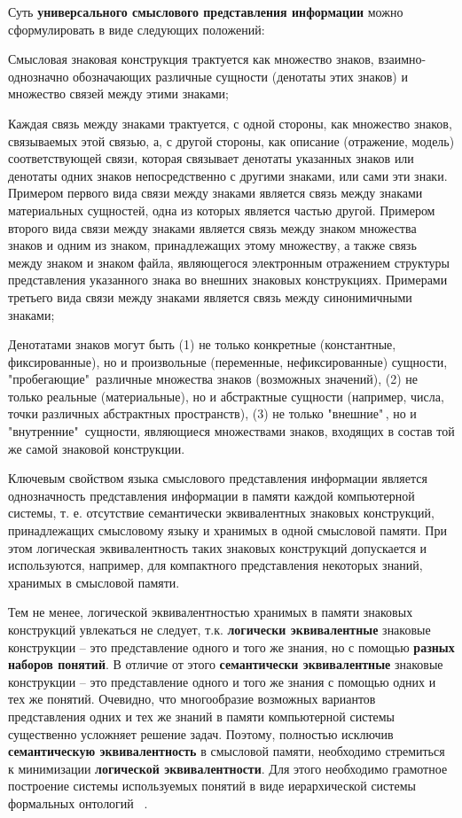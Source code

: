 \begin{SCn}
{Суть \textbf{универсального смыслового представления информации} можно сформулировать в виде следующих положений:
\begin{scnitemize}
    \item Смысловая знаковая конструкция трактуется как множество знаков, взаимно-однозначно обозначающих различные сущности (денотаты этих знаков) и множество связей между этими знаками;
    \item Каждая связь между знаками трактуется, с одной стороны, как множество знаков, связываемых этой связью, а, с другой стороны, как описание (отражение, модель) соответствующей связи, которая связывает денотаты указанных знаков или денотаты одних знаков непосредственно с другими знаками, или сами эти знаки. Примером первого вида связи между знаками является связь между знаками материальных сущностей, одна из которых является частью другой. Примером второго вида связи между знаками является связь между знаком множества знаков и одним из знаком, принадлежащих этому множеству, а также связь между знаком и знаком файла, являющегося электронным отражением структуры представления указанного знака во внешних знаковых конструкциях. Примерами третьего вида связи между знаками является связь между синонимичными знаками;
    \item Денотатами знаков могут быть (1) не только конкретные (константные, фиксированные), но и произвольные (переменные, нефиксированные) сущности, "пробегающие"\ различные множества знаков (возможных значений), 
    (2) не только реальные (материальные), но и абстрактные сущности (например, числа, точки различных абстрактных пространств), 
    (3) не только "внешние"\,, но и "внутренние"\ сущности, являющиеся множествами знаков, входящих в состав той же самой знаковой конструкции.
\end{scnitemize}

Ключевым свойством языка смыслового представления информации является однозначность представления информации в памяти каждой компьютерной системы, т. е. отсутствие семантически эквивалентных знаковых конструкций, принадлежащих смысловому языку и хранимых в одной смысловой памяти. При этом логическая эквивалентность таких знаковых конструкций допускается и используются, например, для компактного представления некоторых знаний, хранимых в смысловой памяти.

Тем не менее, логической эквивалентностью хранимых в памяти знаковых конструкций увлекаться не следует, т.к. \textbf{логически эквивалентные} знаковые конструкции -- это представление одного и того же знания, но с помощью \textbf{разных наборов понятий}. В отличие от этого \textbf{семантически эквивалентные} знаковые конструкции -- это представление одного и того же знания с помощью одних и тех же понятий. Очевидно, что многообразие возможных вариантов представления одних и тех же знаний в памяти компьютерной системы существенно усложняет решение задач. Поэтому, полностью исключив \textbf{семантическую эквивалентность} в смысловой памяти, необходимо стремиться к минимизации \textbf{логической эквивалентности}. Для этого необходимо грамотное построение системы используемых понятий в виде иерархической системы формальных онтологий ~\cite{Davydenko2018}.

}
\end{SCn}
